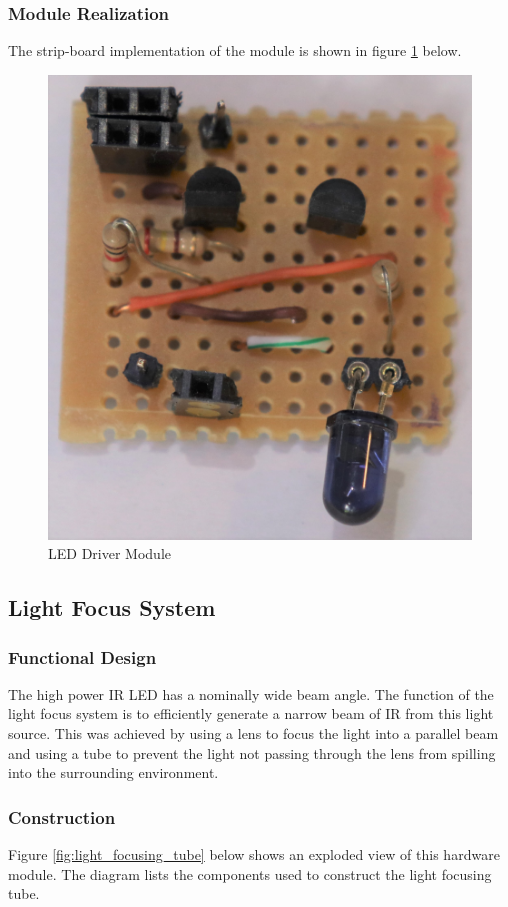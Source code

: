 \subsubsection{Module Realization}
The strip-board implementation of the module is shown in figure \ref{fig:module_led_driver} below.

\begin{figure}[H]
	\centering
	\includegraphics[width=.6\textwidth]{figures/modules/led_driver.jpg}
	\caption{LED Driver Module}
	\label{fig:module_led_driver}
\end{figure}








\subsection{Light Focus System}

\subsubsection{Functional Design}
The high power IR LED has a nominally wide beam angle. The function of the light focus system is to efficiently generate a narrow beam of IR from this light source. This was achieved by using a lens to focus the light into a parallel beam and using a tube to prevent the light not passing through the lens from spilling into the surrounding environment.


\subsubsection{Construction}
Figure \ref{fig:light_focusing_tube} below shows an exploded view of this hardware module. The diagram lists the components used to construct the light focusing tube.

